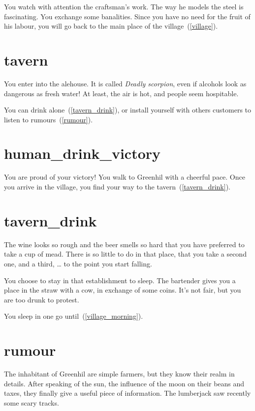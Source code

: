 You watch with attention the craftsman's work. The way he models the steel is
fascinating. You exchange some banalities. Since you have no need for the fruit
of his labour, you will go back to the main place of the village~(\ref{village}).

\section{tavern}

You enter into the alehouse. It is called \textit{Deadly scorpion}, even if
alcohols look as dangerous as fresh water! At least, the air is hot, and people
seem hospitable.

You can drink alone~(\ref{tavern_drink}), or install yourself with others
customers to listen to rumours~(\ref{rumour}).

\section{human_drink_victory}

You are proud of your victory! You walk to Greenhil with a cheerful pace. Once
you arrive in the village, you find your way to the tavern~(\ref{tavern_drink}).

\section{tavern_drink}

The wine looks so rough and the beer smells so hard that you have preferred to
take a cup of mead. There is so little to do in that place, that you take a
second one, and a third, … to the point you start falling.

You choose to stay in that establishment to sleep. The bartender gives you a place in the
straw with a cow, in exchange of some coins. It's not fair, but you are too drunk
to protest.

You sleep in one go until~(\ref{village_morning}).

\section{rumour}

The inhabitant of Greenhil are simple farmers, but they know their realm in
details. After speaking of the sun, the influence of the moon on their beans and
taxes, they finally give a useful piece of information. The lumberjack saw
recently some scary tracks.

